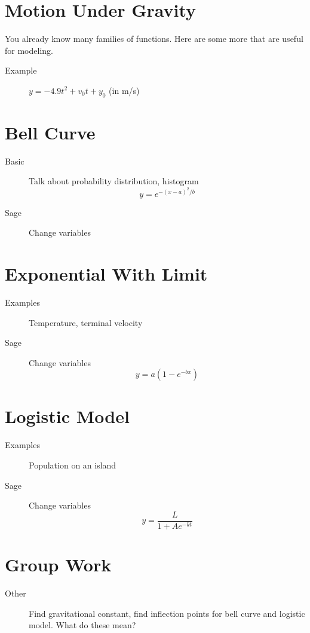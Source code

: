 \documentclass[11pt]{article}
\begin{document}
\drawtitle

\section*{Motion Under Gravity}
You already know many families of functions.  Here are some more that
are useful for modeling.
\begin{description}
\item[Example] $y= -4.9t^2+v_0t+y_0$ (in m/s)
\end{description}

\section*{Bell Curve}
\begin{description}
\item[Basic] Talk about probability distribution, histogram
  \[
  y=e^{-(x-a)^2/b}
  \]
\item[Sage] Change variables
\end{description}

\section*{Exponential With Limit}
\begin{description}
\item[Examples] Temperature, terminal velocity
\item[Sage] Change variables
  \[
  y=a\left(1-e^{-bx}\right)
  \]
\end{description}

\section*{Logistic Model}
\begin{description}
\item[Examples] Population on an island
\item[Sage] Change variables
  \[
  y=\dfrac{L}{1+Ae^{-kt}}
  \]
\end{description}

\section*{Group Work}
\begin{description}
\item[Other] Find gravitational constant, find inflection points for
  bell curve and logistic model.  What do these mean?
\end{description}
\end{document}
